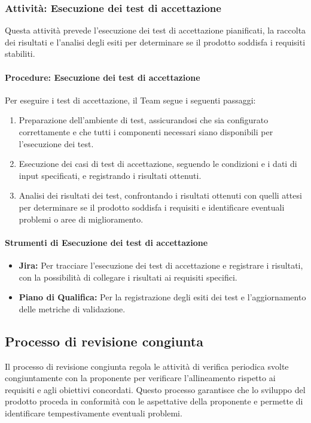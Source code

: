 \documentclass[a4paper,12pt]{article}
\begin{document}
\subsubsection{Attività: Esecuzione dei test di accettazione}
Questa attività prevede l'esecuzione dei test di accettazione pianificati, la raccolta dei risultati e l'analisi degli esiti per determinare se il prodotto
 soddisfa i requisiti stabiliti.

\paragraph{Procedure: Esecuzione dei test di accettazione}
Per eseguire i test di accettazione, il Team segue i seguenti passaggi:
\begin{enumerate}
    \item Preparazione dell'ambiente di test, assicurandosi che sia configurato correttamente e che tutti i componenti necessari siano disponibili per l'esecuzione dei test.
    \item Esecuzione dei casi di test di accettazione, seguendo le condizioni e i dati di input specificati, e registrando i risultati ottenuti.
    \item Analisi dei risultati dei test, confrontando i risultati ottenuti con quelli attesi per determinare se il prodotto soddisfa i requisiti e identificare eventuali problemi o aree di miglioramento.
\end{enumerate}

\paragraph{Strumenti di Esecuzione dei test di accettazione}
\begin{itemize}
    \item \textbf{Jira:} Per tracciare l'esecuzione dei test di accettazione e registrare i risultati, con la possibilità di collegare i risultati ai requisiti specifici.
    \item \textbf{Piano di Qualifica:} Per la registrazione degli esiti dei test e l'aggiornamento delle metriche di validazione.
\end{itemize}


\subsection{Processo di revisione congiunta}\label{proc_revisione_congiunta}
Il processo di revisione congiunta regola le attività di verifica periodica svolte congiuntamente con la proponente per verificare 
l'allineamento rispetto ai requisiti e agli obiettivi concordati. Questo processo garantisce che lo sviluppo del prodotto proceda in conformità 
con le aspettative della proponente e permette di identificare tempestivamente eventuali problemi.
\end{document}
